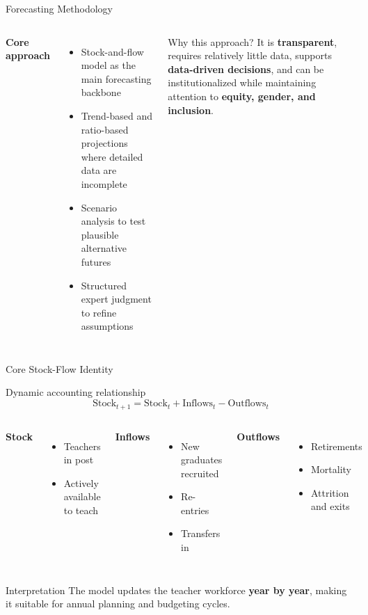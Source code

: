 \documentclass[
  11pt,
  ignorenonframetext,
  aspectratio=169,
  11pt]{beamer}
\newcommand{\highlight}[1]{\textcolor{DavidsonBlueDark}{\textbf{#1}}}
\begin{document}
\begin{frame}{Forecasting Methodology}
\begin{columns}[T,onlytextwidth]
\textbf{Core approach}
\begin{itemize}
  \item Stock-and-flow model as the main forecasting backbone
  \item Trend-based and ratio-based projections where detailed data are incomplete
  \item Scenario analysis to test plausible alternative futures
  \item Structured expert judgment to refine assumptions
\end{itemize}
\begin{block}{Why this approach?}
\justifying
It is \highlight{transparent}, requires relatively little data, supports \highlight{data-driven decisions}, and can be institutionalized while maintaining attention to \highlight{equity, gender, and inclusion}.
\end{block}
\end{columns}
\end{frame}

\begin{frame}{Core Stock-Flow Identity}
\begin{block}{Dynamic accounting relationship}
\[
\mathrm{Stock}_{t+1} = \mathrm{Stock}_{t} + \mathrm{Inflows}_{t} - \mathrm{Outflows}_{t}
\]
\end{block}
\vspace{0.15cm}
\begin{columns}[T,onlytextwidth]
\textbf{Stock}
\begin{itemize}
  \item Teachers in post
  \item Actively available to teach
\end{itemize}
\textbf{Inflows}
\begin{itemize}
  \item New graduates recruited
  \item Re-entries
  \item Transfers in
\end{itemize}
\textbf{Outflows}
\begin{itemize}
  \item Retirements
  \item Mortality
  \item Attrition and exits
\end{itemize}
\end{columns}
\vspace{0.2cm}
\begin{block}{Interpretation}
The model updates the teacher workforce \highlight{year by year}, making it suitable for annual planning and budgeting cycles.
\end{block}
\end{frame}
\end{document}
